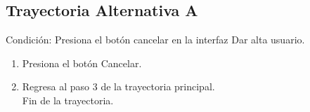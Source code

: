 	\subsection {Trayectoria Alternativa A}
		Condici\'on: Presiona el bot\'on cancelar en la interfaz Dar alta usuario.
			\\
		\begin{enumerate}
			\item Presiona el bot\'on Cancelar.
			\item Regresa al paso 3 de la trayectoria principal.
			\\
			Fin de la trayectoria.
			\\
		\end{enumerate}